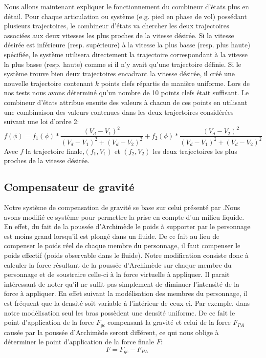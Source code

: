 \documentclass[runningheads,a4paper]{llncs}
\begin{document}
Nous allons maintenant expliquer le fonctionnement du combineur d'états plus en détail. Pour chaque articulation ou système (e.g. pied en phase de vol) possédant plusieurs trajectoires, le combineur d'états va chercher les deux trajectoires associées aux deux vitesses les plus proches de la vitesse désirée. Si la vitesse désirée est inférieure (resp. supérieure) à la vitesse la plus basse (resp. plus haute) spécifiée, le système utilisera directement la trajectoire correspondant à la vitesse la plus basse (resp. haute) comme si il n'y avait qu'une trajectoire définie. Si le système trouve bien deux trajectoires encadrant la vitesse désirée, il créé une nouvelle trajectoire contenant $k$ points clefs répartis de manière uniforme. Lors de nos tests nous avons déterminé qu'un nombre de 10 points clefs était suffisant. Le combineur d'états attribue ensuite des valeurs à chacun de ces points en utilisant une combinaison des valeurs contenues dans les deux trajectoires considérées suivant une loi d'ordre 2:
$$
f(\phi)=f_1(\phi)*\frac{(V_d-V_1)^2}{(V_d-V_1)^2+(V_d-V_2)^2}+f_2(\phi)*\frac{(V_d-V_2)^2}{(V_d-V_1)^2+(V_d-V_2)^2}
$$
Avec $f$ la trajectoire finale,$(f_1,V_1)$ et $(f_2,V_2)$ les deux trajectoires les plus proches de la vitesse désirée.
% 
\subsection{Compensateur de gravité}
\label{sec:grav_comp}
Notre système de compensation de gravité se base sur celui présenté par \cite{coros2010generalized}.Nous avons modifié ce système pour permettre la prise en compte d'un milieu liquide. En effet, du fait de la poussée d'Archimède le poids à supporter par le personnage est moins grand lorsqu'il est plongé dans un fluide. De ce fait au lieu de compenser le poids réel de chaque membre du personnage, il faut compenser le poids effectif (poids observable dans le fluide). Notre modification consiste donc à calculer la force résultant de la poussée d'Archimède sur chaque membre du personnage et de soustraire celle-ci à la force virtuelle à appliquer. Il parait intéressant de noter qu'il ne suffit pas simplement de diminuer l'intensité de la force à appliquer. En effet suivant la modélisation des membres du personnage, il est fréquent que la densité soit variable à l'intérieur de ceux-ci. Par exemple, dans notre modélisation seul les bras possèdent une densité uniforme. De ce fait le point d'application de la force  $F_{gc}$ compensant la gravité et celui de la force $F_{PA}$ causée par la poussée d'Archimède seront différent, ce qui nous oblige à déterminer le point d'application de la force finale $F$:
$$
F=F_{gc}- F_{PA}
$$
\end{document}
